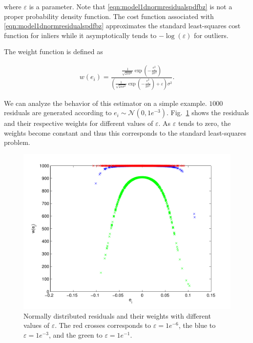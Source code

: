 \documentclass[12pt]{article}
\begin{document}
        \noindent where $\varepsilon$ is a parameter. Note that
        \eqref{eqn:model1dnormresidualspdfbz} is not a proper probability
        density function. The cost function associated with
        \eqref{eqn:model1dnormresidualspdfbz} approximates the standard
        least-squares cost function for inliers while it asymptotically tends
        to $-\log(\varepsilon)$ for outliers.

        The weight function is defined as

        \begin{equation}\label{eqn:model1dwbz}
          \begin{aligned}
          w(e_i) = \frac{\frac{1}{\sqrt{2\pi\sigma^2}}
            \exp(-\frac{e_i^2}{2\sigma^2})}
            {(\frac{1}{\sqrt{2\pi\sigma^2}}\exp(-\frac{e_i^2}{2\sigma^2}) +
            \varepsilon)\sigma^2}.
          \end{aligned}
        \end{equation}

        We can analyze the behavior of this estimator on a simple example.
        $1000$ residuals are generated according to
        $e_i\sim\mathcal{N}(0,1e^{-3})$. Fig.~\ref{fig:bz1} shows the residuals
        and their respective weights for different values of $\varepsilon$.
        As $\varepsilon$ tends to zero, the weights become constant and thus
        this corresponds to the standard least-squares problem.

        \begin{figure}[t]
          \centering
          \includegraphics[scale=0.7]{bz.pdf}
          \caption{Normally distributed residuals and their weights with
            different values of
            $\varepsilon$. The red crosses corresponds to $\varepsilon=1e^{-6}$,
            the blue to $\varepsilon=1e^{-3}$, and the green to
            $\varepsilon=1e^{-1}$.}
          \label{fig:bz1}
        \end{figure}
\end{document}
